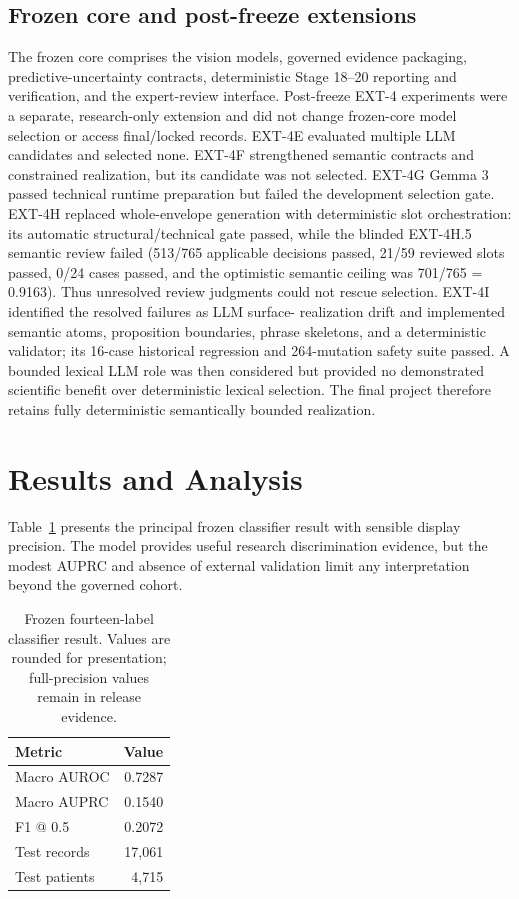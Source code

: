 \documentclass[10pt,a4paper,twocolumn]{article}
\begin{document}
\subsection{Frozen core and post-freeze extensions}
The frozen core comprises the vision models, governed evidence packaging,
predictive-uncertainty contracts, deterministic Stage 18--20 reporting and
verification, and the expert-review interface. Post-freeze EXT-4 experiments
were a separate, research-only extension and did not change frozen-core model
selection or access final/locked records. EXT-4E evaluated multiple LLM
candidates and selected none. EXT-4F strengthened semantic contracts and
constrained realization, but its candidate was not selected. EXT-4G Gemma 3
passed technical runtime preparation but failed the development selection
gate. EXT-4H replaced whole-envelope generation with deterministic slot
orchestration: its automatic structural/technical gate passed, while the
blinded EXT-4H.5 semantic review failed (513/765 applicable decisions passed,
21/59 reviewed slots passed, 0/24 cases passed, and the optimistic semantic
ceiling was 701/765 = 0.9163). Thus unresolved review judgments could not
rescue selection. EXT-4I identified the resolved failures as LLM surface-
realization drift and implemented semantic atoms, proposition boundaries,
phrase skeletons, and a deterministic validator; its 16-case historical
regression and 264-mutation safety suite passed. A bounded lexical LLM role
was then considered but provided no demonstrated scientific benefit over
deterministic lexical selection. The final project therefore retains fully
deterministic semantically bounded realization.

\section{Results and Analysis}
Table~\ref{tab:stage9} presents the principal frozen classifier result with sensible display precision. The model provides useful research discrimination evidence, but the modest AUPRC and absence of external validation limit any interpretation beyond the governed cohort.

\begin{table}[t]
\centering\small
\caption{Frozen fourteen-label classifier result. Values are rounded for presentation; full-precision values remain in release evidence.}
\label{tab:stage9}
\begin{tabular}{@{}lr@{}}
\toprule
Metric & Value\\
\midrule
Macro AUROC & 0.7287\\
Macro AUPRC & 0.1540\\
F1 @ 0.5 & 0.2072\\
Test records & 17,061\\
Test patients & 4,715\\
\bottomrule
\end{tabular}
\end{table}
\end{document}
